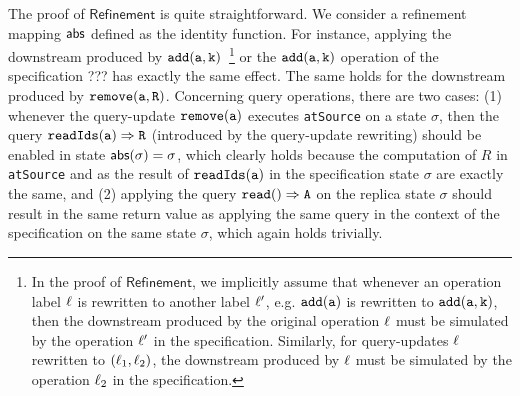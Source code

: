The proof of $\mathsf{Refinement}$ is quite straightforward. We consider a refinement mapping $\mathsf{abs}$ defined as the identity function. For instance, applying the downstream produced by $\alabelshort[{\tt add}]{a,k}$~\footnote{In the proof of $\mathsf{Refinement}$, we implicitly assume that whenever an operation label $\ell$ is rewritten to another label $\ell'$, e.g. $\alabelshort[{\tt add}]{a}$ is rewritten to $\alabelshort[{\tt add}]{a,k}$, then the downstream produced by the original operation $\ell$ must be simulated by the operation $\ell'$ in the specification. Similarly, for query-updates $\ell$ rewritten to $(\ell_1,\ell_2)$, the downstream produced by $\ell$ must be simulated by the operation $\ell_2$ in the specification.}   or the $\alabelshort[{\tt add}]{a,k}$ operation of the specification ??? has exactly the same effect. The same holds for the downstream produced by $\alabelshort[{\tt remove}]{a,R}$. Concerning query operations, there are two cases: (1) whenever the query-update $\alabelshort[{\tt remove}]{a}$ executes \lstinline|atSource| on a state $\sigma$, then the query $\alabellong[{\tt readIds}]{a}{R}{}$ (introduced by the query-update rewriting) should be enabled in state $\mathsf{abs}(\sigma)=\sigma$, which clearly holds because the computation of $R$ in \lstinline|atSource| and as the result of $\alabelshort[{\tt readIds}]{a}$ in the specification state $\sigma$ are exactly the same, and (2) applying the query $\alabellongind[{\tt read}]{}{A}{}$ on the replica state $\sigma$ should result in the same return value as applying the same query in the context of the specification on the same state $\sigma$, which again holds trivially.

